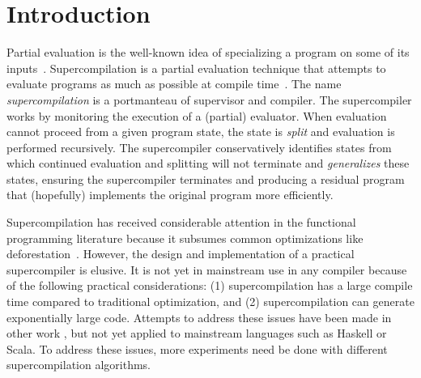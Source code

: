 \newcommand\R[1]{\langle\!\langle#1\rangle\!\rangle}

\section{Introduction}
\label{sec:intro}

Partial evaluation is the well-known 
idea of specializing a program on some of its inputs~\cite{jones}.
Supercompilation is a partial evaluation technique that
attempts to evaluate programs as much as possible
at compile time~\cite{turchin}.
The name \emph{supercompilation} is a portmanteau of supervisor and compiler.
The supercompiler works by monitoring the execution of a (partial) evaluator.
When evaluation cannot proceed from a given program state, the
state is \emph{split} and evaluation is performed recursively. The
supercompiler conservatively identifies states from which continued evaluation
and splitting will not terminate and \emph{generalizes}
these states, ensuring the supercompiler terminates and 
producing a residual program
that (hopefully) implements the original program more efficiently.

Supercompilation has received considerable attention in the functional
programming 
literature because it subsumes common optimizations like deforestation~\cite{
  supercompilation-by-eval,supercompilation-blah}.
However, the design and implementation of a practical supercompiler is
elusive.
It is
not yet in mainstream use in any compiler because of the following
practical considerations: (1) supercompilation has a large compile time
compared to traditional optimization, and (2) supercompilation can generate
exponentially large code.
Attempts to address these issues have been made in
other work \cite{taming-code-explosion}, but not yet applied to 
mainstream languages such as Haskell or Scala.
To address these issues, more experiments need be done with different
supercompilation algorithms.

